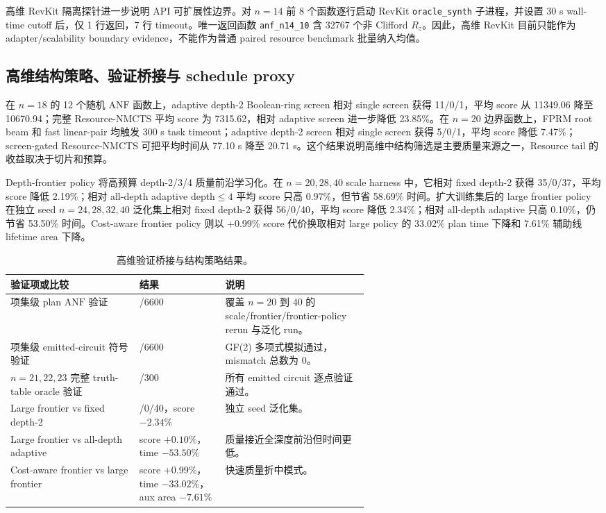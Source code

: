 \documentclass[UTF8,fontset=macnew,11pt]{ctexart}
\newcommand{\method}{Resource-NMCTS}
\newcommand{\anf}{\ensuremath{\mathrm{ANF}}}
\newcommand{\rz}{\ensuremath{R_z}}
\newcommand{\ttable}{truth-table}
\begin{document}
高维 RevKit 隔离探针进一步说明 API 可扩展性边界。对 $n=14$ 前 8 个函数逐行启动 RevKit \texttt{oracle\_synth} 子进程，并设置 30 s wall-time cutoff 后，仅 1 行返回，7 行 timeout。唯一返回函数 \texttt{anf\_n14\_10} 含 32767 个非 Clifford \rz{}。因此，高维 RevKit 目前只能作为 adapter/scalability boundary evidence，不能作为普通 paired resource benchmark 批量纳入均值。

\subsection{高维结构策略、验证桥接与 schedule proxy}

在 $n=18$ 的 12 个随机 \anf{} 函数上，adaptive depth-2 Boolean-ring screen 相对 single screen 获得 11/0/1，平均 score 从 11349.06 降至 10670.94；完整 \method{} 平均 score 为 7315.62，相对 adaptive screen 进一步降低 23.85\%。在 $n=20$ 边界函数上，FPRM root beam 和 fast linear-pair 均触发 300 s task timeout；adaptive depth-2 screen 相对 single screen 获得 5/0/1，平均 score 降低 7.47\%；screen-gated \method{} 可把平均时间从 77.10 s 降至 20.71 s。这个结果说明高维中结构筛选是主要质量来源之一，Resource tail 的收益取决于切片和预算。

Depth-frontier policy 将高预算 depth-2/3/4 质量前沿学习化。在 $n=20,28,40$ scale harness 中，它相对 fixed depth-2 获得 35/0/37，平均 score 降低 2.19\%；相对 all-depth adaptive depth$\leq4$ 平均 score 只高 0.97\%，但节省 58.69\% 时间。扩大训练集后的 large frontier policy 在独立 seed $n=24,28,32,40$ 泛化集上相对 fixed depth-2 获得 56/0/40，平均 score 降低 2.34\%；相对 all-depth adaptive 只高 0.10\%，仍节省 53.50\% 时间。Cost-aware frontier policy 则以 +0.99\% score 代价换取相对 large policy 的 33.02\% plan time 下降和 7.61\% 辅助线 lifetime area 下降。

\begin{table}[H]
\centering
\small
\caption{高维验证桥接与结构策略结果。}
\label{tab:highdim-validation}
\begin{tabularx}{\linewidth}{>{\raggedright\arraybackslash}p{0.36\linewidth}>{\raggedright\arraybackslash}p{0.24\linewidth}>{\raggedright\arraybackslash}X}
\toprule
验证项或比较 & 结果 & 说明 \\
\midrule
项集级 plan \anf{} 验证 & 6600/6600 & 覆盖 $n=20$ 到 $40$ 的 scale/frontier/frontier-policy rerun 与泛化 run。 \\
项集级 emitted-circuit 符号验证 & 6600/6600 & GF(2) 多项式模拟通过，mismatch 总数为 0。 \\
$n=21,22,23$ 完整 \ttable{} oracle 验证 & 300/300 & 所有 emitted circuit 逐点验证通过。 \\
Large frontier vs fixed depth-2 & 56/0/40，score $-2.34\%$ & 独立 seed 泛化集。 \\
Large frontier vs all-depth adaptive & score $+0.10\%$，time $-53.50\%$ & 质量接近全深度前沿但时间更低。 \\
Cost-aware frontier vs large frontier & score $+0.99\%$，time $-33.02\%$，aux area $-7.61\%$ & 快速质量折中模式。 \\
\bottomrule
\end{tabularx}
\end{table}
\end{document}
